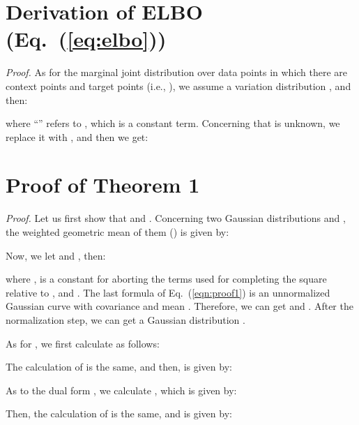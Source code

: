 \documentclass[nohyperref]{article}
\theoremstyle{plain}
\theoremstyle{definition}
\theoremstyle{remark}
\begin{document}




\newpage
\appendix
\onecolumn




\section{Derivation of ELBO (Eq.~(\ref{eq:elbo}))}

\emph{Proof.} As for the marginal joint distribution  over  data points in which there are  context points and  target points (i.e., ), we assume a variation distribution , and then: 

where ``'' refers to , which is a constant term.  Concerning that  is unknown, we replace it with , and then we get:

\hfill  



\section{Proof of Theorem 1}

\emph{Proof.} Let us first show that   and . Concerning two Gaussian distributions  and , the weighted geometric mean of them () is given by:

Now, we let  and , then:



where ,  is a constant for aborting the terms used for completing the square relative to , and .
The last formula of Eq.~(\ref{eqn:proof1}) is an unnormalized Gaussian curve with covariance  and mean . Therefore, we can get  and . After the normalization step, we can get a Gaussian distribution .

\smallskip
As for , we first calculate  as follows:


The calculation of  is the same, and then,  is given by:


As to the dual form , we calculate , which is given by:

Then, the calculation of  is the same, and  is given by:


\hfill 
\end{document}
